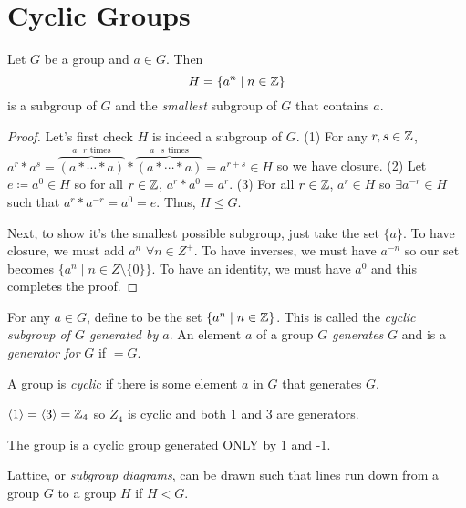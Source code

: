 \section{Cyclic Groups}

\begin{theorem}
    Let $G$ be a group and $a \in G$. Then $$H = \{a^n \mid n \in \mathbb{Z}\}$$ is a subgroup of $G$ and the \emph{smallest} subgroup of $G$ that contains $a$.
\end{theorem}
\begin{proof}
    Let's first check $H$ is indeed a subgroup of $G$. (1) For any $r,s \in \mathbb{Z}$, $a^r*a^s = \overbrace{(a*\cdots*a)}^{\text{$a$ $r$ times}}*\overbrace{(a*\cdots*a)}^{\text{$a$ $s$ times}}=a^{r+s} \in H$ so we have closure. (2) Let $e \coloneq a^0 \in H$ so for all $r \in \mathbb{Z}$, $a^r*a^0=a^r$. (3) For all $r \in \mathbb{Z}$, $a^r \in H$ so $\exists a^{-r} \in H$ such that $a^r*a^{-r} = a^0 = e$. Thus, $H \leq G$.

    Next, to show it's the smallest possible subgroup, just take the set $\{a\}$. To have closure, we must add $a^n$ $\forall n\in Z^+$. To have inverses, we must have $a^{-n}$ so our set becomes $\{a^n \mid n \in Z\setminus\{0\}\}$. To have an identity, we must have $a^0$ and this completes the proof.
\end{proof}
\begin{definition}
    For any $a \in G$, define  to be the set $\{a^n \mid n \in \mathbb{Z}\}$. This is called the \emph{cyclic subgroup of $G$ generated by $a$}. An element $a$ of a group $G$ \emph{generates} $G$ and is a \emph{generator for} $G$ if  $= G$.
\end{definition}
\begin{definition}
    A group is \emph{cyclic} if there is some element $a$ in $G$ that generates $G$.
\end{definition}
\begin{example}
    $\langle 1 \rangle = \langle 3 \rangle = \mathbb{Z}_4$ so $Z_4$ is cyclic and both 1 and 3 are generators.
\end{example}
\begin{example}
    The group \group{$\Z$}{+} is a cyclic group generated ONLY by 1 and -1.
\end{example}
\begin{remark}
    Lattice, or \emph{subgroup diagrams}, can be drawn such that lines run down from a group $G$ to a group $H$ if $H < G$. 
\end{remark}
